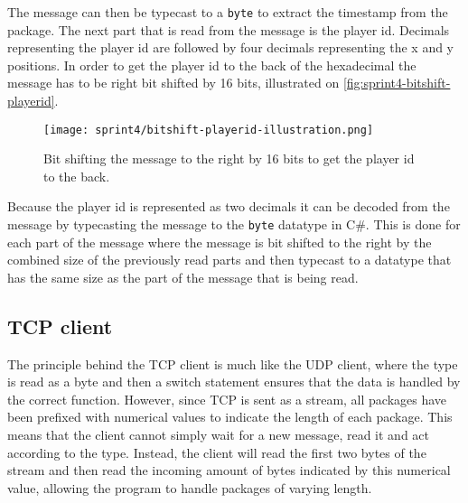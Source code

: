 \noindent
The message can then be typecast to a \texttt{byte} to extract the timestamp from the package.
The next part that is read from the message is the player id.
Decimals representing the player id are followed by four decimals representing the x and y positions.
In order to get the player id to the back of the hexadecimal the message has to be right bit shifted by 16 bits, illustrated on \autoref{fig:sprint4-bitshift-playerid}.
\begin{figure}[H]
    \centering
    \texttt{[image: sprint4/bitshift-playerid-illustration.png]}
    \caption{Bit shifting the message to the right by 16 bits to get the player id to the back.}
    \label{fig:sprint4-bitshift-playerid}
\end{figure}
\noindent
Because the player id is represented as two decimals it can be decoded from the message by typecasting the message to the \texttt{byte} datatype in C\#.
This is done for each part of the message where the message is bit shifted to the right by the combined size of the previously read parts and then typecast to a datatype that has the same size as the part of the message that is being read.
\subsection*{TCP client}
The principle behind the TCP client is much like the UDP client, where the type is read as a byte and then a switch statement ensures that the data is handled by the correct function.
However, since TCP is sent as a stream, all packages have been prefixed with numerical values to indicate the length of each package.
This means that the client cannot simply wait for a new message, read it and act according to the type.
Instead, the client will read the first two bytes of the stream and then read the incoming amount of bytes indicated by this numerical value, allowing the program to handle packages of varying length.
